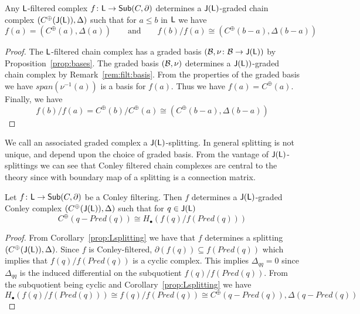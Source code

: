 \begin{cor}\label{prop:Lsplitting}
Any ${\mathsf L}$-filtered complex $f\colon {\mathsf L}\to \mathsf{Sub}(C,\partial)$ determines a ${\mathsf J}({\mathsf L})$-graded chain complex $(C^\oplus({\mathsf J}({\mathsf L})),\Delta)$  such that for $a\leq b$ in ${\mathsf L}$ we have
\[
f(a)= (C^\oplus(a),\Delta(a))\quad\quad\text{and}\quad\quad f(b)/f(a) \cong (C^\oplus(b-a),\Delta(b-a))
\]
\end{cor}
\begin{proof}
The ${\mathsf L}$-filtered chain complex has a graded basis $({\mathcal B},\nu\colon {\mathcal B}\to {\mathsf J}({\mathsf L}))$ by Proposition~\ref{prop:bases}.  The graded basis $({\mathcal B},\nu)$ determines a ${\mathsf J}({\mathsf L}))$-graded chain complex by Remark~\ref{rem:filt:basis}.  From the properties of the graded basis we have $span(\nu^{-1}(a))$ is a basis for $f(a)$.  Thus we have $f(a) = C^\oplus(a)$.  Finally, we have 
\[
f(b)/f(a) = C^\oplus(b)/C^\oplus(a)  \cong (C^\oplus(b-a),\Delta(b-a))
\]
\end{proof}

We call an associated graded complex a ${\mathsf J}({\mathsf L})$-splitting.  In general splitting is not unique, and depend upon the choice of graded basis.  From the vantage of ${\mathsf J}({\mathsf L})$-splittings we can see that Conley filtered chain complexes are central to the theory since with boundary map of a splitting is a connection matrix.

\begin{cor}
Let $f\colon {\mathsf L} \to \mathsf{Sub}(C,\partial)$  be a Conley filtering. Then $f$ determines a ${\mathsf J}({\mathsf L})$-graded Conley complex $(C^\oplus({\mathsf J}({\mathsf L})),\Delta)$ such that for $q\in {\mathsf J}({\mathsf L})$
\[
C^\oplus(q-Pred(q)) \cong H_\bullet(f(q)/f(Pred(q))) 
\]
\end{cor}
\begin{proof}
From Corollary~\ref{prop:Lsplitting} we have that $f$ determines a splitting $(C^\oplus({\mathsf J}({\mathsf L})),\Delta)$.  Since $f$ is Conley-filtered, $\partial(f(q))\subseteq f(Pred(q))$ which implies that $f(q)/f(Pred(q))$ is a cyclic complex.  This implies $\Delta_{qq}=0$ since $\Delta_{qq}$ is the induced differential on the subquotient $f(q)/f(Pred(q))$.  From the subquotient being cyclic and Corollary~\ref{prop:Lsplitting} we have
\[
H_\bullet( f(q)/f(Pred(q)))\cong f(q)/f(Pred(q))\cong C^\oplus(q-Pred(q)),\Delta(q-Pred(q))
\]
 
\end{proof}

